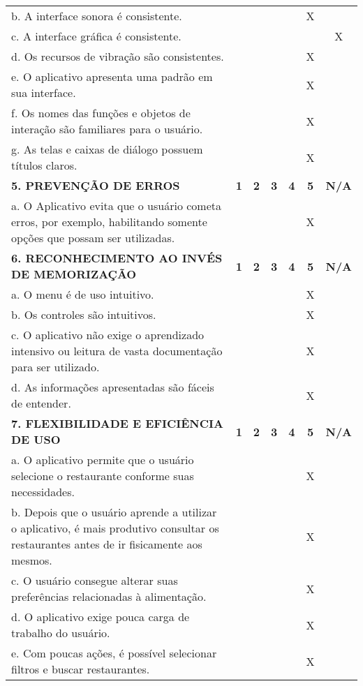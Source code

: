 \documentclass[portuguese,oneside]{tcc}
\begin{document}
\begin{center}
\begin{longtabu}{|L{25em}|c|c|c|c|c|c|}
	b. A interface sonora é consistente. & & & & & X & \\ 
	c. A interface gráfica é consistente. & & & & & & X \\ 
	d. Os recursos de vibração são consistentes. & & & & & X & \\ 
	e. O aplicativo apresenta uma padrão em sua interface. & & & & & X & \\ 
	f. Os nomes das funções e objetos de interação são familiares para o usuário. & & & & & X & \\ 
	g. As telas e caixas de diálogo possuem títulos claros. & & & & & X & \\ 
	\textbf{5. PREVENÇÃO DE ERROS} & \textbf{1} & \textbf{2} & \textbf{3} & \textbf{4} & \textbf{5} & \textbf{N/A} \\ 
	a. O Aplicativo evita que o usuário cometa erros, por exemplo, habilitando somente opções que possam ser utilizadas. & & & & & X & \\ 
	\textbf{6. RECONHECIMENTO AO INVÉS DE MEMORIZAÇÃO} & \textbf{1} & \textbf{2} & \textbf{3} & \textbf{4} & \textbf{5} & \textbf{N/A} \\ 
	a. O  menu é de uso intuitivo. & & & & & X & \\ 
	b. Os controles são intuitivos. & & & & & X & \\ 
	c. O aplicativo não exige o aprendizado intensivo ou leitura de vasta documentação para ser utilizado. & & & & & X & \\ 
	d. As informações apresentadas são fáceis de entender. & & & & & X & \\ 
	\textbf{7. FLEXIBILIDADE E EFICIÊNCIA DE USO} & \textbf{1} & \textbf{2} & \textbf{3} & \textbf{4} & \textbf{5} & \textbf{N/A} \\ 
	a. O aplicativo permite que o usuário selecione o restaurante conforme suas necessidades. & & & & & X & \\ 
	b. Depois que o usuário aprende a utilizar o aplicativo, é mais produtivo consultar os restaurantes antes de ir fisicamente aos mesmos. & & & & & X & \\ 
	c. O usuário consegue alterar suas preferências relacionadas à alimentação. & & & & & X & \\ 
	d. O aplicativo exige pouca carga de trabalho do usuário. & & & & & X & \\ 
	e. Com poucas ações, é possível selecionar filtros e buscar restaurantes. & & & & & X & \\ 

\end{longtabu}
\end{center}
\end{document}
